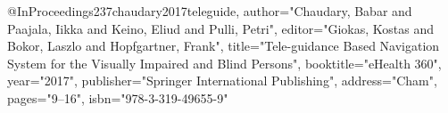 @InProceedings{237chaudary2017teleguide,
author="Chaudary, Babar
and Paajala, Iikka
and Keino, Eliud
and Pulli, Petri",
editor="Giokas, Kostas
and Bokor, Laszlo
and Hopfgartner, Frank",
title="Tele-guidance Based Navigation System for the Visually Impaired and Blind Persons",
booktitle="eHealth 360{\textdegree}",
year="2017",
publisher="Springer International Publishing",
address="Cham",
pages="9--16",
isbn="978-3-319-49655-9"
}